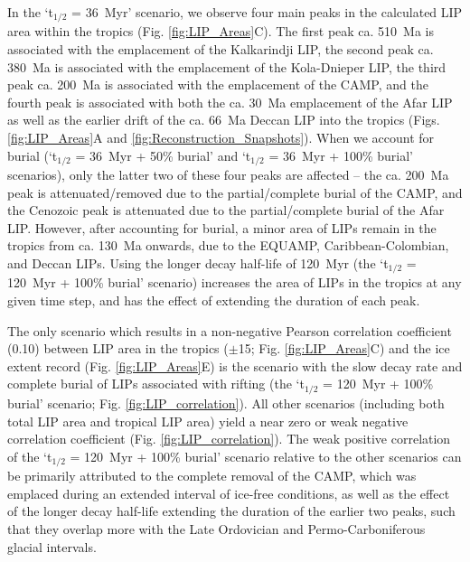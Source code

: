 \documentclass[11pt,letterpaper]{article}
\begin{document}
In the `t$_{1/2}$ = 36~Myr' scenario, we observe four main peaks in the calculated LIP area within the tropics (Fig. \ref{fig:LIP_Areas}C). The first peak ca. 510~Ma is associated with the emplacement of the Kalkarindji LIP, the second peak ca. 380~Ma is associated with the emplacement of the Kola-Dnieper LIP, the third peak ca. 200~Ma is associated with the emplacement of the CAMP, and the fourth peak is associated with both the ca. 30~Ma emplacement of the Afar LIP as well as the earlier drift of the ca. 66~Ma Deccan LIP into the tropics (Figs. \ref{fig:LIP_Areas}A and \ref{fig:Reconstruction_Snapshots}). When we account for burial (`t$_{1/2}$ = 36~Myr + 50\% burial' and `t$_{1/2}$ = 36~Myr + 100\% burial' scenarios), only the latter two of these four peaks are affected -- the ca. 200~Ma peak is attenuated/removed due to the partial/complete burial of the CAMP, and the Cenozoic peak is attenuated due to the partial/complete burial of the Afar LIP. However, after accounting for burial, a minor area of LIPs remain in the tropics from ca. 130~Ma onwards, due to the EQUAMP, Caribbean-Colombian, and Deccan LIPs. Using the longer decay half-life of 120~Myr (the `t$_{1/2}$ = 120~Myr + 100\% burial' scenario) increases the area of LIPs in the tropics at any given time step, and has the effect of extending the duration of each peak.

The only scenario which results in a non-negative Pearson correlation coefficient (0.10) between LIP area in the tropics ($\pm$15\textdegree; Fig. \ref{fig:LIP_Areas}C) and the ice extent record (Fig. \ref{fig:LIP_Areas}E) is the scenario with the slow decay rate and complete burial of LIPs associated with rifting (the `t$_{1/2}$ = 120~Myr + 100\% burial' scenario; Fig. \ref{fig:LIP_correlation}). All other scenarios (including both total LIP area and tropical LIP area) yield a near zero or weak negative correlation coefficient (Fig. \ref{fig:LIP_correlation}). The weak positive correlation of the `t$_{1/2}$ = 120~Myr + 100\% burial' scenario relative to the other scenarios can be primarily attributed to the complete removal of the CAMP, which was emplaced during an extended interval of ice-free conditions, as well as the effect of the longer decay half-life extending the duration of the earlier two peaks, such that they overlap more with the Late Ordovician and Permo-Carboniferous glacial intervals.
\end{document}
